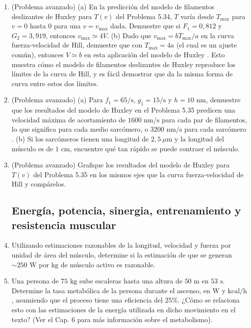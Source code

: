 \documentclass[12pt]{book}
\begin{document}
\begin{enumerate}
\item[5.35] (Problema avanzado)
(a) En la predicción del modelo de filamentos deslizantes de Huxley para $T(v)$ del Problema 5.34, $T$ varía desde $T_{\text{max}}$ para $v = 0$ hasta $0$ para una $v = v_{\text{max}}$ dada. Demuestre que si $F_1 = 0{,}812$ y $G_2 = 3{,}919$, entonces $v_{\text{max}} \simeq 4V$.
(b) Dado que $v_{\text{max}} = b T_{\text{max}}/a$ en la curva fuerza-velocidad de Hill, demuestre que con $T_{\text{max}} = 4a$ (el cual es un ajuste común), entonces $V \simeq b$ en esta aplicación del modelo de Huxley \cite{41}. Esto muestra cómo el modelo de filamentos deslizantes de Huxley reproduce los límites de la curva de Hill, y es fácil demostrar que da la misma forma de curva entre estos dos límites.

\item[5.36] (Problema avanzado)
(a) Para $f_1 = 65/\text{s}$, $g_1 = 15/\text{s}$ y $h = 10\text{ nm}$, demuestre que los resultados del modelo de Huxley en el Problema 5.35 predicen una velocidad máxima de acortamiento de $1600\text{ nm/s}$ para cada par de filamentos, lo que significa para cada medio sarcómero, o $3200\text{ nm/s}$ para cada sarcómero \cite{41}.
(b) Si los sarcómeros tienen una longitud de $2{,}5\ \mu\text{m}$ y la longitud del músculo es de $1\text{ cm}$, encuentre qué tan rápido se puede contraer el músculo.

\item[5.37] (Problema avanzado) Grafique los resultados del modelo de Huxley para $T(v)$ del Problema 5.35 en los mismos ejes que la curva fuerza-velocidad de Hill y compárelos.

\subsection*{Energía, potencia, sinergia, entrenamiento y resistencia muscular}

\item[5.38] Utilizando estimaciones razonables de la longitud, velocidad y fuerza por unidad de área del músculo, determine si la estimación de que se generan $\sim 250\text{ W}$ por $\text{kg}$ de músculo activo es razonable.

\item[5.39] Una persona de $75\text{ kg}$ sube escaleras hasta una altura de $50\text{ m}$ en $53\text{ s}$. Determine la tasa metabólica de la persona durante el ascenso, en $\text{W}$ y $\text{kcal/h}$, asumiendo que el proceso tiene una eficiencia del $25\%$. ¿Cómo se relaciona esto con las estimaciones de la energía utilizada en dicho movimiento en el texto? (Ver el Cap. 6 para más información sobre el metabolismo).


\end{enumerate}
\end{document}
